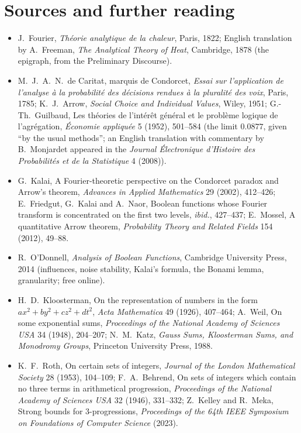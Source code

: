 \section*{Sources and further reading}

\begin{itemize}
\item J.~Fourier, \emph{Théorie analytique de la chaleur}, Paris, 1822; English translation by A.~Freeman, \emph{The Analytical Theory of
Heat}, Cambridge, 1878 (the epigraph, from the Preliminary Discourse).
\item M.~J.~A.~N.~de Caritat, marquis de Condorcet, \emph{Essai sur l'application de l'analyse à la probabilité des décisions rendues à la
pluralité des voix}, Paris, 1785; K.~J.~Arrow, \emph{Social Choice and Individual Values}, Wiley, 1951; G.-Th.~Guilbaud, Les théories de
l'intérêt général et le problème logique de l'agrégation, \emph{Économie appliquée} 5 (1952), 501--584 (the limit $0.0877$, given ``by the
usual methods''; an English translation with commentary by B.~Monjardet appeared in the \emph{Journal Électronique d'Histoire des
Probabilités et de la Statistique} 4 (2008)).
\item G.~Kalai, A Fourier-theoretic perspective on the Condorcet paradox and Arrow's theorem, \emph{Advances in Applied Mathematics} 29
(2002), 412--426; E.~Friedgut, G.~Kalai and A.~Naor, Boolean functions whose Fourier transform is concentrated on the first two
levels, \emph{ibid.}, 427--437; E.~Mossel, A quantitative Arrow theorem, \emph{Probability Theory and Related Fields} 154 (2012), 49--88.
\item R.~O'Donnell, \emph{Analysis of Boolean Functions}, Cambridge University Press, 2014 (influences, noise stability, Kalai's formula,
the Bonami lemma, granularity; free online).
\item H.~D.~Kloosterman, On the representation of numbers in the form $ax^2+by^2+cz^2+dt^2$, \emph{Acta Mathematica} 49 (1926), 407--464;
A.~Weil, On some exponential sums, \emph{Proceedings of the National Academy of Sciences USA} 34 (1948), 204--207; N.~M.~Katz,
\emph{Gauss Sums, Kloosterman Sums, and Monodromy Groups}, Princeton University Press, 1988.
\item K.~F.~Roth, On certain sets of integers, \emph{Journal of the London Mathematical Society} 28 (1953), 104--109; F.~A.~Behrend, On sets
of integers which contain no three terms in arithmetical progression, \emph{Proceedings of the National Academy of Sciences USA} 32
(1946), 331--332; Z.~Kelley and R.~Meka, Strong bounds for 3-progressions, \emph{Proceedings of the 64th IEEE Symposium on Foundations of Computer Science} (2023).

\end{itemize}
